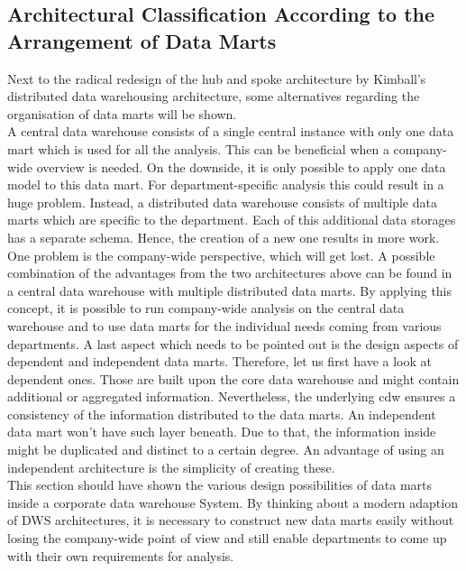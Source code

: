 \subsection{Architectural Classification According to the Arrangement of Data Marts}
Next to the radical redesign of the hub and spoke architecture by Kimball's distributed data warehousing architecture, some alternatives regarding the organisation of data marts will be shown.\newline
\\
A central data warehouse consists of a single central instance with only one data mart which is used for all the analysis. This can be beneficial when a company-wide overview is needed. On the downside, it is only possible to apply one data model to this data mart. For department-specific analysis this could result in a huge problem. \newline
Instead, a distributed data warehouse consists of multiple data marts which are specific to the department. Each of this additional data storages has a separate schema. Hence, the creation of a new one results in more work. One problem is the company-wide perspective, which will get lost. \newline
A possible combination of the advantages from the two architectures above can be found in a central data warehouse with multiple distributed data marts. By applying this concept, it is possible to run company-wide analysis on the central data warehouse and to use data marts for the individual needs coming from various departments.
\newline
A last aspect which needs to be pointed out is the design aspects of dependent and independent data marts. Therefore, let us first have a look at dependent ones. Those are built upon the core data warehouse and might contain additional or aggregated information. Nevertheless, the underlying \acrshort{cdw} ensures a consistency of the information distributed to the data marts. An independent data mart won't have such layer beneath. Due to that, the information inside might be duplicated and distinct to a certain degree. An advantage of using an independent architecture is the simplicity of creating these. \cite{scriptRasch} \newline
\\
This section should have shown the various design possibilities of data marts inside a corporate data warehouse System. By thinking about a modern adaption of DWS architectures, it is necessary to construct new data marts easily without losing the company-wide point of view and still enable departments to come up with their own requirements for analysis. 

